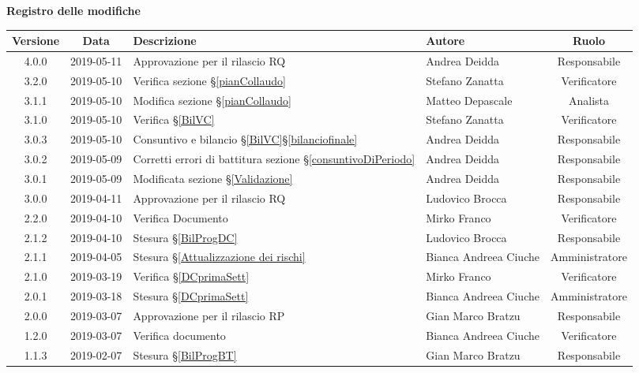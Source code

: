 	\begin{center}
		\textbf{Registro delle modifiche}
	\end{center}
	\begin{center}
		\begin{tabularx}{\textwidth}{|c|c|X|X|c|}
			\hline
			\textbf{Versione} & \textbf{Data} & \textbf{Descrizione} & \textbf{Autore} & \textbf{Ruolo} \\
			\hline
			4.0.0 & 2019-05-11 & Approvazione per il rilascio RQ & Andrea Deidda & Responsabile \\
			\hline 3.2.0&2019-05-10& Verifica sezione \S\ref{pianCollaudo}&Stefano Zanatta& Verificatore\\
			\hline 3.1.1&2019-05-10&Modifica sezione \S\ref{pianCollaudo}&Matteo Depascale& Analista\\
			\hline
			3.1.0 & 2019-05-10 & Verifica \S\ref{BilVC} & Stefano Zanatta & Verificatore \\
			\hline
			3.0.3 & 2019-05-10 & Consuntivo e bilancio \S\ref{BilVC}\S\ref{bilanciofinale} & Andrea Deidda & Responsabile \\
			\hline
			3.0.2 & 2019-05-09 & Corretti errori di battitura sezione \S\ref{consuntivoDiPeriodo} & Andrea Deidda & Responsabile \\
			\hline
			3.0.1 & 2019-05-09 & Modificata sezione \S\ref{Validazione} & Andrea Deidda & Responsabile \\
			\hline
			3.0.0 &2019-04-11&Approvazione per il rilascio RQ & Ludovico Brocca & Responsabile\\
			\hline
			2.2.0 &2019-04-10&Verifica Documento& Mirko Franco & Verificatore\\
			\hline
			2.1.2 &2019-04-10&Stesura \S\ref{BilProgDC}& Ludovico Brocca & Responsabile\\
			\hline
			2.1.1 & 2019-04-05 & Stesura  \S\ref{Attualizzazione dei rischi} & Bianca Andreea Ciuche & Amministratore \\		
			\hline
			2.1.0 &2019-03-19&Verifica  \S\ref{DCprimaSett}& Mirko Franco & Verificatore\\
			\hline
			2.0.1 & 2019-03-18 & Stesura  \S\ref{DCprimaSett} & Bianca Andreea Ciuche & Amministratore \\
			\hline
			2.0.0 & 2019-03-07 & Approvazione per il rilascio RP & Gian Marco Bratzu & Responsabile \\
			\hline
			1.2.0 & 2019-03-07 & Verifica documento & Bianca Andreea Ciuche & Verificatore \\
			\hline
			1.1.3 & 2019-02-07 & Stesura \S\ref{BilProgBT} & Gian Marco Bratzu & Responsabile \\

\end{tabularx}
\end{center}
